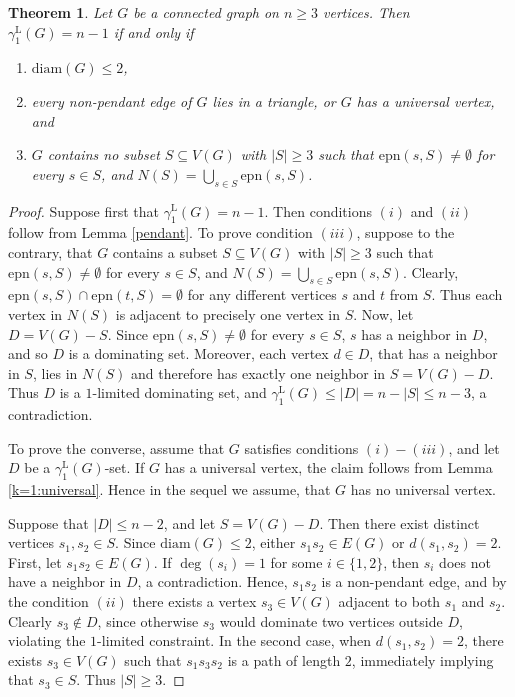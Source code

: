 \documentclass[11pt]{article}
\newtheorem{theorem}{Theorem}
\newcommand{\epn}{\mbox{epn}}
\newcommand{\gammaenaL}{\gamma_1^{\mathrm L}}
\begin{document}
\begin{theorem}\label{zg-kar}
Let $G$ be a connected graph on $n\geq 3$ vertices. Then $\gammaenaL(G)=n-1$ if and only if
\begin{enumerate}
\item[(i)] $\mathrm{diam}(G)\leq 2$,
\item[(ii)] every non-pendant edge of $G$ lies in a triangle, or $G$ has a universal vertex, and
\item[(iii)] $G$ contains no subset $S \subseteq V(G)$ with $|S|\ge 3$
such that $\epn(s,S)\neq\emptyset$ for every $s\in S$, and $N(S)=\displaystyle \bigcup _{s\in S}\epn(s,S)$.
\end{enumerate}
\end{theorem}


\begin{proof}
Suppose first that $\gammaenaL(G)=n-1$. 
Then conditions $(i)$ and $(ii)$ follow from Lemma \ref{pendant}. To prove condition $(iii)$, suppose to the contrary, that $G$ contains a subset $S \subseteq V(G)$ with $|S|\ge 3$
such that $\epn(s,S)\neq\emptyset$ for every $s\in S$, and $N(S)= \bigcup _{s\in S}\epn(s,S)$.
Clearly, $\epn(s,S)\cap \epn(t,S)=\emptyset$ for any different vertices $s$ and $t$ from $S$. Thus each vertex in $N(S)$ is adjacent to precisely one vertex in $S$. 
Now, let $D=V(G)-S$.
Since $\epn(s,S)\neq\emptyset$ for every $s\in S$, $s$ has a neighbor in $D$, and so $D$ is a dominating set. Moreover, each vertex $d\in D$, that has a neighbor in $S$, lies in $N(S)$ and therefore
has exactly one neighbor in $S=V(G)-D$. 
Thus $D$ is a $1$-limited dominating set, and $\gammaenaL(G)\leq |D|=n-|S|\leq n-3$, a contradiction.




To prove the converse, assume that $G$ satisfies conditions $(i)-(iii)$, and let $D$ be a $\gammaenaL(G)$-set. 
If $G$ has a universal vertex, the claim follows from Lemma \ref{k=1:universal}. Hence in the sequel we assume, that $G$ has no universal vertex. 

Suppose that $|D|\leq n-2$, and let $S=V(G)-D$.
Then there exist distinct vertices $s_1, s_2\in S$. Since $\text{diam}(G)\leq 2$, either $s_1s_2\in E(G)$ or $d(s_1,s_2)=2$.  
First, let $s_1s_2\in E(G)$. If $\deg(s_i)=1$ for some $i\in\{1,2\}$, then $s_i$ does not have a neighbor in $D$, a contradiction. Hence, $s_1s_2$ is a non-pendant edge, and by the condition $(ii)$ there exists a vertex $s_3\in V(G)$ adjacent to both $s_1$ and $s_2$. Clearly $s_3\notin D$, since otherwise $s_3$ would dominate two vertices outside $D$, violating the $1$-limited constraint. 
In the second case, when $d(s_1,s_2)=2$, there exists $s_3\in V(G)$ such that $s_1s_3s_2$ is a path of length $2$, immediately implying that $s_3\in S$. Thus $|S|\geq 3$. 


\end{proof}
\end{document}
